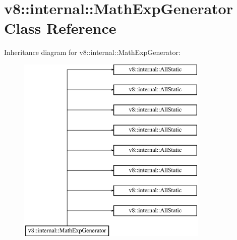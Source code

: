 \hypertarget{classv8_1_1internal_1_1_math_exp_generator}{}\section{v8\+:\+:internal\+:\+:Math\+Exp\+Generator Class Reference}
\label{classv8_1_1internal_1_1_math_exp_generator}
Inheritance diagram for v8\+:\+:internal\+:\+:Math\+Exp\+Generator\+:\begin{figure}[H]
\begin{center}
\leavevmode
\includegraphics[height=9.000000cm]{classv8_1_1internal_1_1_math_exp_generator}
\end{center}
\end{figure}
